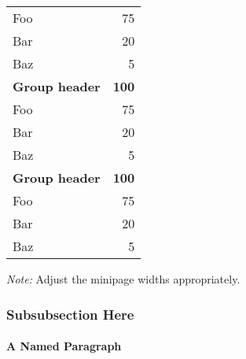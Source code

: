 \begin{sidewaystable}
\begin{minipage}[t]{0.22\textwidth}
\begin{tabular}[t]{lr}
\midrule
Foo & 75\\ 
Bar & 20\\
Baz & 5\\
\addlinespace
\addlinespace
\textbf{Group header} & \textbf{100}\\ 
\midrule
Foo & 75\\ 
Bar & 20\\
Baz & 5\\
\addlinespace
\addlinespace
\textbf{Group header} & \textbf{100}\\ 
\midrule
Foo & 75\\ 
Bar & 20\\
Baz & 5\\
\bottomrule
\end{tabular} 
\end{minipage}

\bigskip
\raggedright
\footnotesize{\emph{Note:} Adjust the minipage widths appropriately.
}
\end{sidewaystable}

\subsubsection{Subsubsection Here}\label{subsubsec:intro-subsubsection}
\kant[32]

\paragraph{A Named Paragraph}
\kant[33]



